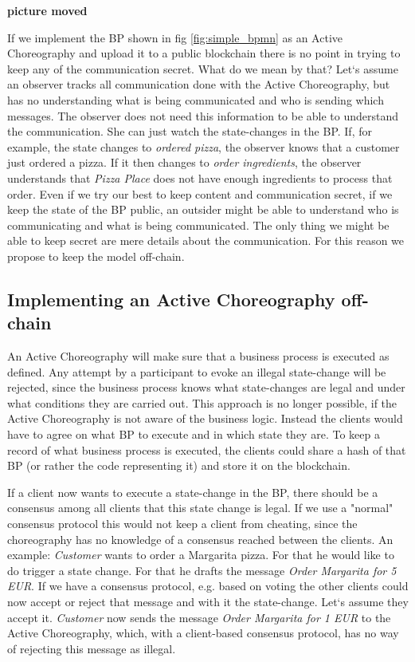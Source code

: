 \documentclass[runningheads]{llncs}
\begin{document}
\textbf{picture moved}

If we implement the BP shown in fig \ref{fig:simple_bpmn} as an Active Choreography and upload it to a public blockchain there is no point in trying to keep any of the communication secret. What do we mean by that? Let`s assume an observer tracks all communication done with the Active Choreography, but has no understanding what is being communicated and who is sending which messages. The observer does not need this information to be able to understand the communication. She can just watch the state-changes in the BP. If, for example, the state changes to \textit{ordered pizza}, the observer knows that a customer just ordered a pizza. If it then changes to \textit{order ingredients}, the observer understands that \textit{Pizza Place} does not have enough ingredients to process that order. Even if we try our best to keep content and communication secret, if we keep the state of the BP public, an outsider might be able to understand who is communicating and what is being communicated. The only thing we might be able to keep secret are mere details about the communication. For this reason we propose to keep the model off-chain. 


\subsection{Implementing an Active Choreography off-chain}

An Active Choreography will make sure that a business process is executed as defined. Any attempt by a participant to evoke an illegal state-change will be rejected, since the business process knows what state-changes are legal and under what conditions they are carried out. This approach is no longer possible, if the Active Choreography is not aware of the business logic. Instead the clients would have to agree on what BP to execute and in which state they are. To keep a record of what business process is executed, the clients could share a hash of that BP (or rather the code representing it) and store it on the blockchain. 

If a client now wants to execute a state-change in the BP, there should be a consensus among all clients that this state change is legal. If we use a "normal" consensus protocol this would not keep a client from cheating, since the choreography has no knowledge of a consensus reached between the clients. An example: \textit{Customer} wants to order a Margarita pizza. For that he would like to do trigger a state change. For that he drafts the message \textit{Order Margarita for 5 EUR}. If we have a consensus protocol, e.g. based on voting the other clients could now accept or reject that message and with it the state-change. Let`s assume they accept it. \textit{Customer} now sends the message \textit{Order Margarita for 1 EUR} to the Active Choreography, which, with a client-based consensus protocol, has no way of rejecting this message as illegal. 
\end{document}
